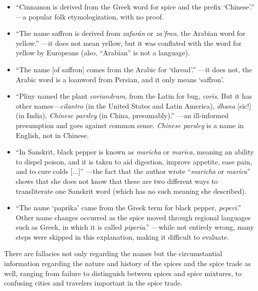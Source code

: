 \begin{itemize}
    \item ``Cinnamon is derived from the Greek word for spice and the prefix `Chinese'.'' \autocite[10]{czarra_spices_2009}---a popular folk etymologization, with no proof. 
    \item ``The name saffron is derived from \textit{zafarán} or \textit{za'fran}, the Arabian word for yellow.'' \autocite[124]{van_wyk_culinary_2014}---it does not mean yellow, but it was conflated with the word for yellow by Europeans (also, ``Arabian'' is not a language).
    \item ``The name [of saffron] comes from the Arabic for `thread'.'' \autocite[422]{mcgee_food_2004}---it does not, the Arabic word is a loanword from Persian, and it only means `saffron'. 
    \item ``Pliny named the plant \textit{coriandrum}, from the Latin for bug, \textit{coris}. But it has other names---\textit{cilantro} (in the United States and Latin America), \textit{dhana} [sic!] (in India), \textit{Chinese parsley} (in China, presumably).'' \autocite[87]{oconnell_book_2016}---an ill-informed presumption and goes against common sense. \textit{Chinese parsley} is a name in English, not in Chinese.
    \item ``In Sanskrit, black pepper is known as \textit{maricha} or \textit{marica}, meaning an ability to dispel poison, and it is taken to aid digestion, improve appetite, ease pain, and to cure colds [...]'' \autocite[3]{shaffer_pepper_2013}---the fact that the author wrote ``\textit{maricha} or \textit{marica}'' shows that she does not know that these are two different ways to transliterate one Sanskrit word (which has no such meaning she described).
    \item ``The name `paprika' came from the Greek term for black pepper, \textit{peperi}.'' 
    Other name changes occurred as the spice moved through regional languages such as Greek, in which it is called \textit{piperia}.'' 
    \autocite[103]{czarra_spices_2009}---while not entirely wrong, many steps were skipped in this explanation, making it difficult to evaluate.
\end{itemize}

There are fallacies not only regarding the names but the circumstantial information regarding the nature and history of the spices and the spice trade as well, ranging from failure to distinguish between spices and spice mixtures, to confusing cities and travelers important in the spice trade.

